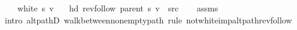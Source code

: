 \begin{isabellebody}
\ \ \ {\isachardoublequoteopen}{\isasymnot}\ white\ s\ v{\isachardoublequoteclose}\isanewline
\ \ \ {\isachardoublequoteopen}hd\ {\isacharparenleft}{\kern0pt}rev{\isacharunderscore}{\kern0pt}follow\ {\isacharparenleft}{\kern0pt}parent\ s{\isacharparenright}{\kern0pt}\ v{\isacharparenright}{\kern0pt}\ {\isacharequal}{\kern0pt}\ src{\isachardoublequoteclose}\isanewline
%
\isadelimproof
\ \ %
\endisadelimproof
%
\isatagproof
{}\isamarkupfalse%
\ assms\isanewline
\ \ \isamarkupfalse%
\ {\isacharparenleft}{\kern0pt}intro\ alt{\isacharunderscore}{\kern0pt}pathD{\isacharparenleft}{\kern0pt}{}{\isacharparenright}{\kern0pt}\ walk{\isacharunderscore}{\kern0pt}between{\isacharunderscore}{\kern0pt}nonempty{\isacharunderscore}{\kern0pt}path{\isacharparenleft}{\kern0pt}{}{\isacharparenright}{\kern0pt}{\isacharparenright}{\kern0pt}\ {\isacharparenleft}{\kern0pt}rule\ not{\isacharunderscore}{\kern0pt}white{\isacharunderscore}{\kern0pt}imp{\isacharunderscore}{\kern0pt}alt{\isacharunderscore}{\kern0pt}path{\isacharunderscore}{\kern0pt}rev{\isacharunderscore}{\kern0pt}follow{\isacharparenright}{\kern0pt}%
\endisatagproof
{\isafoldproof}%
%
\isadelimproof
\isanewline
%
\endisadelimproof
%
\isadelimtheory
\isanewline
%
\endisadelimtheory
%
\isatagtheory
{}\isamarkupfalse%
%
\endisatagtheory
{\isafoldtheory}%
%
\isadelimtheory
%
\endisadelimtheory
%
\end{isabellebody}%
\endinput

